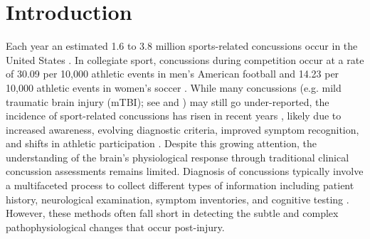 \documentclass[12pt]{article}
\begin{document}
\section{Introduction}
\label{sec:intro}

Each year an estimated 1.6 to 3.8 million sports-related concussions occur in the United States \parencite{langlois2006EpidemiologyImpactTraumatic,daneshvar2011EpidemiologySportRelatedConcussion,barkhoudarian2016MolecularPathophysiologyConcussive}. In collegiate sport, concussions during competition occur at a rate of 30.09 per 10,000 athletic events in men's American football and 14.23 per 10,000 athletic events in women's soccer \parencite{pierpoint2021EpidemiologySportRelatedConcussion}. While many concussions (e.g. mild traumatic brain injury (mTBI); see \textcite{mayer2017SpectrumMildTraumatic} and \textcite{silverberg2023AmericanCongressRehabilitation}) may still go under-reported, the incidence of sport-related concussions has risen in recent years \parencite{coronado2015TrendsSportsRecreationRelated,pierpoint2021EpidemiologySportRelatedConcussion}, likely due to increased awareness, evolving diagnostic criteria, improved symptom recognition, and shifts in athletic participation \parencite{yang2017NewRecurrentConcussions}. Despite this growing attention, the understanding of the brain's physiological response through traditional clinical concussion assessments remains limited. Diagnosis of concussions typically involve a multifaceted process to collect different types of information including patient history, neurological examination, symptom inventories, and cognitive testing \parencite{patricios2023ConsensusStatementConcussion}. However, these methods often fall short in detecting the subtle and complex pathophysiological changes that occur post-injury.
\end{document}

